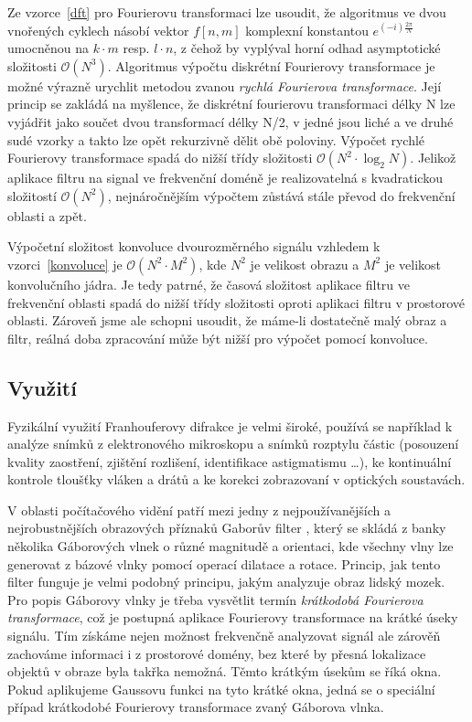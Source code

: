 \documentclass[11pt,a4paper]{article}
\begin{document}
Ze vzorce~\ref{dft} pro Fourierovu transformaci lze usoudit, že algoritmus ve dvou vnořených cyklech
násobí vektor $f[n,m]$ komplexní konstantou $e^{(-i)\frac{2\pi}{N}}$ umocněnou na $k\cdot m$ resp.
$l\cdot n$, z čehož by vyplýval horní odhad asymptotické složitosti $\mathcal{O}(N^3)$. 
Algoritmus výpočtu diskrétní Fourierovy transformace je možné výrazně urychlit metodou zvanou 
\textit{rychlá Fourierova transformace}. Její princip se zakládá na myšlence, že diskrétní fourierovu
transformaci délky N lze vyjádřit jako součet dvou transformací délky N/2, v jedné jsou liché a ve
druhé sudé vzorky a takto lze opět rekurzivně dělit obě poloviny. Výpočet rychlé Fourierovy transformace
spadá do nižší třídy složitosti $\mathcal{O}(N^2 \cdot \log_{2}{N})$. Jelikož aplikace filtru na signal ve
frekvenční doméně je realizovatelná s kvadratickou složitostí $\mathcal{O}(N^2)$, nejnáročnějším výpočtem
zůstává stále převod do frekvenční oblasti a zpět.

Výpočetní složitost konvoluce dvourozměrného signálu vzhledem k vzorci~\ref{konvoluce} je 
$\mathcal{O}(N^2 \cdot M^2)$, kde $N^2$ je velikost obrazu a $M^2$ je velikost konvolučního jádra. Je 
tedy patrné, že časová složitost aplikace filtru ve frekvenční oblasti spadá do nižší třídy složitosti 
oproti aplikaci filtru v prostorové oblasti. Zároveň jsme ale schopni usoudit, že máme-li dostatečně
malý obraz a filtr, reálná doba zpracování může být nižší pro výpočet pomocí konvoluce.

\subsection{Využití}
Fyzikální využití Franhouferovy difrakce je velmi široké, používá se například k analýze snímků z elektronového 
mikroskopu a snímků rozptylu částic (posouzení kvality zaostření, zjištění rozlišení, identifikace astigmatismu 
\dots), ke kontinuální kontrole tloušťky vláken a drátů a ke korekci zobrazovaní v optických soustavách. 

V oblasti počítačového vidění patří mezi jedny z nejpoužívanějších a nejrobustnějších obrazových příznaků 
Gaborův filter \cite{gabor}, který se skládá z banky několika Gáborových vlnek o různé magnitudě a orientaci, kde všechny
vlny lze generovat z bázové vlnky pomocí operací dilatace a rotace. Princip, jak tento filter funguje je velmi 
podobný principu, jakým analyzuje obraz lidský mozek. Pro popis Gáborovy vlnky je třeba vysvětlit termín
\textit{krátkodobá Fourierova transformace}, což je postupná aplikace Fourierovy transformace na krátké
úseky signálu. Tím získáme nejen možnost frekvenčně analyzovat signál ale zárověň zachováme informaci i 
z prostorové domény, bez které by přesná lokalizace objektů v obraze byla takřka nemožná. Těmto krátkým
úsekům se říká okna. Pokud aplikujeme Gaussovu funkci na tyto krátké okna, jedná se o speciální případ
krátkodobé Fourierovy transformace zvaný Gáborova vlnka.
\end{document}

